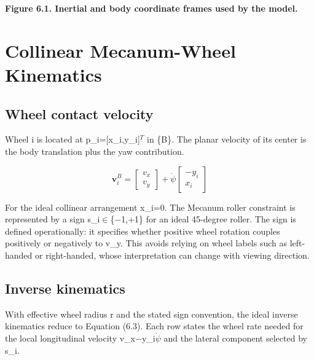 \begin{center}\singlespacing
{}
\textbf{Figure 6.1. Inertial and body coordinate frames used by the model.}
\end{center}

\section{Collinear Mecanum-Wheel Kinematics}\label{collinear-mecanum-wheel-kinematics}

\subsection{Wheel contact velocity}\label{wheel-contact-velocity}

Wheel i is located at p\_i=[x\_i,y\_i]\ensuremath{^{T}} in \{B\}. The planar
velocity of its center is the body translation plus the yaw
contribution.

\begin{equation}
\mathbf{v}_{i}^{B}=\begin{bmatrix}v_x\\v_y\end{bmatrix}+
\dot{\psi}\begin{bmatrix}-y_i\\x_i\end{bmatrix}
\label{eq:6-2}
\end{equation}

For the ideal collinear arrangement x\_i=0. The Mecanum roller
constraint is represented by a sign s\_i\ensuremath{\in}\{\ensuremath{-}1,+1\} for an ideal
45-degree roller. The sign is defined operationally: it specifies
whether positive wheel rotation couples positively or negatively to
v\_y. This avoids relying on wheel labels such as left-handed or
right-handed, whose interpretation can change with viewing direction.

\subsection{Inverse kinematics}\label{inverse-kinematics}

With effective wheel radius r and the stated sign convention, the ideal
inverse kinematics reduce to Equation (6.3). Each row states the wheel
rate needed for the local longitudinal velocity v\_x\ensuremath{-}y\_i\ensuremath{\dot{\psi}} and the
lateral component selected by s\_i.

